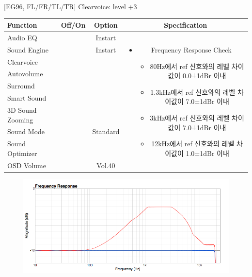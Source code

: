\documentclass{beamer}
\begin{document}
\begin{frame}[t]{[EG96, FL/FR/TL/TR] Clearvoice: level +3}
\begin{tiny}
\begin{tabular}{@{}lccc@{}}
\toprule
Function & Off/On & Option & Specification \\
\midrule
Audio EQ & \color{black}{Off} & Instart &
\multirow{10}{60mm}{
\begin{itemize}
\item Frequency Response Check
	\begin{itemize}
	\item 80Hz에서 ref 신호와의 레벨 차이값이 0.0±1dBr 이내
	\item 1.3kHz에서 ref 신호와의 레벨 차이값이 7.0±1dBr 이내
	\item 3kHz에서 ref 신호와의 레벨 차이값이 7.0±1dBr 이내
	\item 12kHz에서 ref 신호와의 레벨 차이값이 1.0±1dBr 이내
	\end{itemize}
\end{itemize}
} \\
Sound Engine & \color{blue}{On} & Instart & \\
Clearvoice & \color{blue}{On} & \color{blue}{+3} & \\
Autovolume & \color{black}{Off} & & \\
Surround & \color{black}{Off} & & \\
Smart Sound & \color{black}{Off} & & \\
3D Sound Zooming & \color{black}{Off} & & \\
Sound Mode & \color{blue}{On} & Standard & \\
Sound Optimizer & \color{black}{Off} & & \\
OSD Volume & \color{blue}{On} & Vol.40 & \\
\midrule
\end{tabular}
\end{tiny}

\begin{figure}[b]
\includegraphics[height=0.4\textwidth]{figure/EG96/cv3.png}
\end{figure}

\end{frame}
\end{document}
